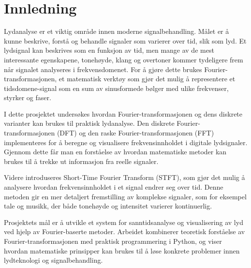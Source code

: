 \section{Innledning}
Lydanalyse er et viktig område innen moderne signalbehandling. Målet er å kunne beskrive, forstå og behandle signaler som varierer over tid, slik som lyd. Et lydsignal kan beskrives som en funksjon av tid, men mange av de mest interessante egenskapene, tonehøyde, klang og overtoner kommer tydeligere frem når signalet analyseres i frekvensdomenet. For å gjøre dette brukes Fourier-transformasjonen, et matematisk verktøy som gjør det mulig å representere et tidsdomene-signal som en sum av sinusformede bølger med ulike frekvenser, styrker og faser.

I dette prosjektet undersøkes hvordan Fourier-transformasjonen og dens diskrete varianter kan brukes til praktisk lydanalyse. Den diskrete Fourier-transformasjonen (DFT) og den raske Fourier-transformasjonen (FFT) implementeres for å beregne og visualisere frekvensinnholdet i digitale lydsignaler. Gjennom dette får man en forståelse av hvordan matematiske metoder kan brukes til å trekke ut informasjon fra reelle signaler.

Videre introduseres Short-Time Fourier Transform (STFT), som gjør det mulig å analysere hvordan frekvensinnholdet i et signal endrer seg over tid. Denne metoden gir en mer detaljert fremstilling av komplekse signaler, som for eksempel tale og musikk, der både tonehøyde og intensitet varierer kontinuerlig.

Prosjektets mål er å utvikle et system for sanntidsanalyse og visualisering av lyd ved hjelp av Fourier-baserte metoder. Arbeidet kombinerer teoretisk forståelse av Fourier-transformasjonen med praktisk programmering i Python, og viser hvordan matematiske prinsipper kan brukes til å løse konkrete problemer innen lydteknologi og signalbehandling.